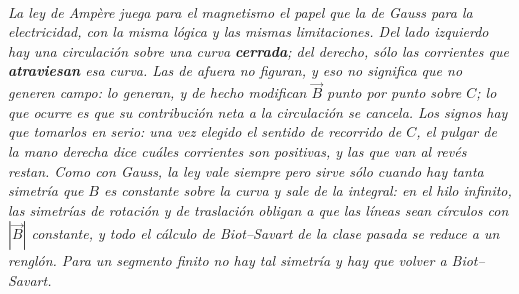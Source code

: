 \begin{center}
\\[0.5em]
{\small\itshape La ley de Ampère juega para el magnetismo el papel que la de
Gauss para la electricidad, con la misma lógica y las mismas limitaciones. Del
lado izquierdo hay una circulación sobre una curva \textbf{cerrada}; del
derecho, sólo las corrientes que \textbf{atraviesan} esa curva. Las de afuera no
figuran, y eso no significa que no generen campo: lo generan, y de hecho
modifican $\vec B$ punto por punto sobre $C$; lo que ocurre es que su
contribución neta a la circulación se cancela. Los signos hay que tomarlos en
serio: una vez elegido el sentido de recorrido de $C$, el pulgar de la mano
derecha dice cuáles corrientes son positivas, y las que van al revés restan.
Como con Gauss, la ley vale siempre pero \emph{sirve} sólo cuando hay tanta
simetría que $B$ es constante sobre la curva y sale de la integral: en el hilo
infinito, las simetrías de rotación y de traslación obligan a que las líneas
sean círculos con $|\vec B|$ constante, y todo el cálculo de Biot--Savart de la
clase pasada se reduce a un renglón. Para un segmento finito no hay tal simetría
y hay que volver a Biot--Savart.}
\end{center}
